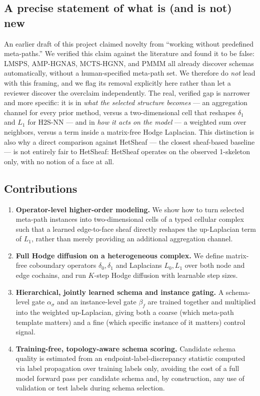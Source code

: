 \documentclass{article}
\begin{document}
\subsection{A precise statement of what is (and is not) new}

An earlier draft of this project claimed novelty from ``working without predefined meta-paths.'' We
verified this claim against the literature and found it to be false: LMSPS, AMP-HGNAS, MCTS-HGNN,
and PMMM all already discover schemas automatically, without a human-specified meta-path set. We
therefore do \emph{not} lead with this framing, and we flag its removal explicitly here rather than
let a reviewer discover the overclaim independently. The real, verified gap is narrower and more
specific: it is in \emph{what the selected structure becomes} --- an aggregation channel for every
prior method, versus a two-dimensional cell that reshapes $\delta_1$ and $L_1$ for H2S-NN --- and in
\emph{how it acts on the model} --- a weighted sum over neighbors, versus a term inside a
matrix-free Hodge Laplacian. This distinction is also why a direct comparison against HetSheaf ---
the closest sheaf-based baseline --- is not entirely fair to HetSheaf: HetSheaf operates on the
observed 1-skeleton only, with no notion of a face at all.

\subsection{Contributions}

\begin{enumerate}
  \item \textbf{Operator-level higher-order modeling.} We show how to turn selected meta-path
  instances into two-dimensional cells of a typed cellular complex such that a learned edge-to-face
  sheaf directly reshapes the up-Laplacian term of $L_1$, rather than merely providing an
  additional aggregation channel.
  \item \textbf{Full Hodge diffusion on a heterogeneous complex.} We define matrix-free coboundary
  operators $\delta_0,\delta_1$ and Laplacians $L_0,L_1$ over both node and edge cochains, and run
  $K$-step Hodge diffusion with learnable step sizes.
  \item \textbf{Hierarchical, jointly learned schema and instance gating.} A schema-level gate
  $\alpha_\sigma$ and an instance-level gate $\beta_f$ are trained together and multiplied into the
  weighted up-Laplacian, giving both a coarse (which meta-path template matters) and a fine (which
  specific instance of it matters) control signal.
  \item \textbf{Training-free, topology-aware schema scoring.} Candidate schema quality is
  estimated from an endpoint-label-discrepancy statistic computed via label propagation over
  training labels only, avoiding the cost of a full model forward pass per candidate schema and,
  by construction, any use of validation or test labels during schema selection.
\end{enumerate}
\end{document}
